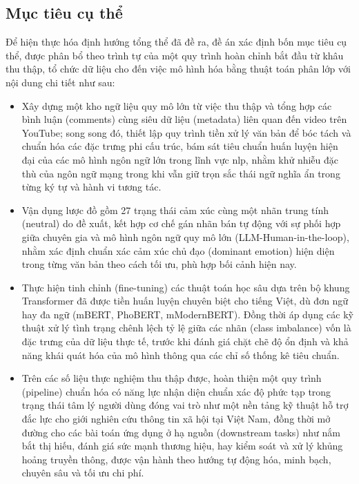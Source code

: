 \subsection{Mục tiêu cụ thể}
Để hiện thực hóa định hướng tổng thể đã đề ra, đề án xác định bốn mục tiêu cụ thể, được phân bổ theo trình tự của một quy trình hoàn chỉnh bắt đầu từ khâu thu thập, tổ chức dữ liệu cho đến việc mô hình hóa bằng thuật toán phân lớp với nội dung chi tiết như sau:
\begin{itemize}[label=-]
    \item Xây dựng một kho ngữ liệu quy mô lớn từ việc thu thập và tổng hợp các bình luận (comments) cùng siêu dữ liệu (metadata) liên quan đến video trên YouTube; song song đó, thiết lập quy trình tiền xử lý văn bản để bóc tách và chuẩn hóa các đặc trưng phi cấu trúc, bám sát tiêu chuẩn huấn luyện hiện đại của các mô hình ngôn ngữ lớn trong lĩnh vực \acrshort{nlp}, nhằm khử nhiễu đặc thù của ngôn ngữ mạng trong khi vẫn giữ trọn sắc thái ngữ nghĩa ẩn trong từng ký tự và hành vi tương tác.
    \item Vận dụng lược đồ gồm 27 trạng thái cảm xúc cùng một nhãn trung tính (neutral) do \textcite{demszky2020goemotions} đề xuất, kết hợp cơ chế gán nhãn bán tự động với sự phối hợp giữa chuyên gia và mô hình ngôn ngữ quy mô lớn (LLM-Human-in-the-loop), nhằm xác định chuẩn xác cảm xúc chủ đạo (dominant emotion) hiện diện trong từng văn bản theo cách tối ưu, phù hợp bối cảnh hiện nay.
    \item Thực hiện tinh chỉnh (fine-tuning) các thuật toán học sâu dựa trên bộ khung Transformer đã được tiền huấn luyện chuyên biệt cho tiếng Việt, dù đơn ngữ hay đa ngữ (mBERT, PhoBERT, mModernBERT). Đồng thời áp dụng các kỹ thuật xử lý tình trạng chênh lệch tỷ lệ giữa các nhãn (class imbalance) vốn là đặc trưng của dữ liệu thực tế, trước khi đánh giá chặt chẽ độ ổn định và khả năng khái quát hóa của mô hình thông qua các chỉ số thống kê tiêu chuẩn.
    \item Trên các số liệu thực nghiệm thu thập được, hoàn thiện một quy trình (pipeline) chuẩn hóa có năng lực nhận diện chuẩn xác độ phức tạp trong trạng thái tâm lý người dùng đóng vai trò như một nền tảng kỹ thuật hỗ trợ đắc lực cho giới nghiên cứu thông tin xã hội tại Việt Nam, đồng thời mở đường cho các bài toán ứng dụng ở hạ nguồn (downstream tasks) như nắm bắt thị hiếu, đánh giá sức mạnh thương hiệu, hay kiểm soát và xử lý khủng hoảng truyền thông, được vận hành theo hướng tự động hóa, minh bạch, chuyên sâu và tối ưu chi phí.
\end{itemize}

